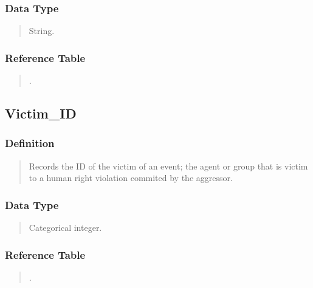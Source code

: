 \documentclass[letterpaper,10pt,english]{sphinxmanual}
\begin{document}
\subsubsection{Data Type}
\label{\detokenize{database_schema:id6}}\begin{quote}

\sphinxAtStartPar
String.
\end{quote}


\subsubsection{Reference Table}
\label{\detokenize{database_schema:id7}}\begin{quote}

\sphinxAtStartPar
{\hyperref[\detokenize{database_schema:aggressor-table}]{}}.
\end{quote}


\subsection{Victim\_ID}
\label{\detokenize{database_schema:victim-id}}

\subsubsection{Definition}
\label{\detokenize{database_schema:id8}}\begin{quote}

\sphinxAtStartPar
Records the ID of the victim of an event; the agent or group that is victim to a human right violation commited by the aggressor.
\end{quote}


\subsubsection{Data Type}
\label{\detokenize{database_schema:id9}}\begin{quote}

\sphinxAtStartPar
Categorical integer.
\end{quote}


\subsubsection{Reference Table}
\label{\detokenize{database_schema:id10}}\begin{quote}

\sphinxAtStartPar
{\hyperref[\detokenize{database_schema:victim-table}]{}}.
\end{quote}
\end{document}

